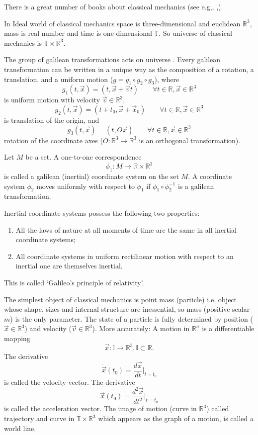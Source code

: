 There is a great number of books about classical mechanics 
(see e.g\cite{Arnold-cm},\cite{Landau-Lifshitz-1},
\cite{Lanczos},\cite{Goldstein}). 

In Ideal world of classical mechanics space is three-dimensional  and euclidean
$\mathbb{R}^3$, mass is real number and time is one-dimensional $\mathbb{T}$.
So universe of classical mechanics is $\mathbb{T} \times \mathbb{R}^3$. 

 The  group of galilean transformations acts on universe \cite{Arnold-cm}. 
Every galilean transformation can be written in a unique way as the composition of a rotation, a translation,
and a uniform motion ($g = g_1 \circ g_2 \circ g_3$), where
\[g_1(t,\vec x)=(t,\vec x+\vec v t)\qquad \forall t\in \mathbb{R},\vec x \in\mathbb{R}^3\] 
is uniform motion with velocity $\vec v \in\mathbb{R}^3$,
\[g_2(t,\vec x)=(t+t_0,\vec x+\vec x_0)\qquad \forall t\in \mathbb{R},\vec x \in\mathbb{R}^3\] 
is translation of the origin, and
\[g_3(t,\vec x)=(t,O\vec x)\qquad \forall t\in \mathbb{R},\vec x \in\mathbb{R}^3\] 
rotation of the coordinate axes ($O:\mathbb{R}^3 \rightarrow \mathbb{R}^3$ is an orthogonal transformation).

Let $M$ be a set. A one-to-one correspondence 
\[\phi_1: M \rightarrow \mathbb{R} \times \mathbb{R}^3\]
is called a galilean (inertial) coordinate system on the set $M$. A coordinate system $\phi_2$ moves
uniformly with respect to $\phi_1$  if $\phi_1\circ\phi_2^{-1}$ is a galilean
transformation. 

Inertial coordinate systems  possess the following two properties:
\begin{enumerate}
    \item All the laws of nature at all moments of time are the same in all inertial coordinate systems;
    \item  All coordinate systems in uniform rectilinear motion with respect to an inertial one are themselves inertial.
\end{enumerate}
This is called `Galileo's principle of relativity'.

The simplest object of classical mechanics is point mass (particle) i.e. object whose shape, 
sizes and internal structure are inessential, so mass (positive scalar $m$) is the only parameter. 
The state of a particle is fully determined by position ($\vec x \in\mathbb{R}^3$) 
and velocity ($\vec v \in\mathbb{R}^3$). 
More accurately: A motion in $\mathbb{R}^n$ is a differentiable mapping 
\[\vec x: \mathbb{I}\rightarrow \mathbb{R}^3, \mathbb{I} \subset \mathbb{R}.\] 
The derivative 
\[\dot \vec{x}(t_0)=\frac{d\vec x}{dt}|_{t=t_0}\]
is called the velocity vector. 
The derivative 
\[\ddot \vec x(t_0)=\frac{ d^2 \vec x}{dt^2}|_{t=t_0}\]
is called the acceleration vector. 
The image of motion (curve in $\mathbb{R}^3$) called trajectory and  curve in 
$\mathbb{T} \times \mathbb{R}^3$ which appears  as the graph of a motion, is called a world line.

